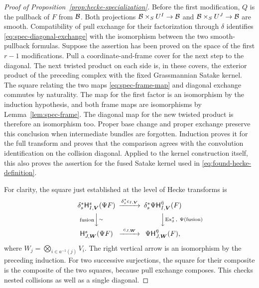\begin{proof}[Proof of Proposition~\ref{prop:hecke-specialization}]
Before the first modification, $Q$ is the pullback of $F$ from $\mathcal B$.
Both projections $\mathcal B\times_S U^I\to\mathcal B$ and
$\mathcal B\times_S U^J\to\mathcal B$ are smooth.  Compatibility of pull exchange
for their factorization through $\delta$ identifies
\eqref{eq:spec-diagonal-exchange} with the isomorphism between the two
smooth-pullback formulas.  Suppose the assertion has been proved on the
space of the first $r-1$ modifications.  Pull a coordinate-and-frame
cover for the next step to the diagonal.  The next twisted product on
each side is, in these covers, the exterior product of the preceding
complex with the fixed Grassmannian Satake kernel.  The square relating
the two maps \eqref{eq:spec-frame-map} and diagonal exchange commutes
by naturality.  The map for the first factor is an isomorphism by the
induction hypothesis, and both frame maps are isomorphisms by
Lemma~\ref{lem:spec-frame}.  The diagonal map for the new twisted
product is therefore an isomorphism too.  Proper base change and proper
exchange preserve this conclusion when intermediate bundles are
forgotten.  Induction proves it for the full transform and proves that
the comparison agrees with the convolution identification on the
collision diagonal.  Applied to the kernel construction itself, this
also proves the assertion for the fused Satake kernel used in
\eqref{eq:found-hecke-definition}.

For clarity, the square just established at the level of Hecke transforms
is
\[
\begin{CD}
 \delta_s^*\Hecke^s_{I,\boldsymbol V}(\Psi F)
       @>{\delta_s^*c_{I,\boldsymbol V}}>>
             \delta_s^*\Psi \Hecke^{\bar\eta}_{I,\boldsymbol V}(F)\\
 @V{\mathrm{fusion}}V{\sim}V
       @VV{\operatorname{Ex}^*_{\delta}\,,\ \Psi(\mathrm{fusion})}V\\
 \Hecke^s_{J,\boldsymbol W}(\Psi F)
       @>{c_{J,\boldsymbol W}}>>
             \Psi \Hecke^{\bar\eta}_{J,\boldsymbol W}(F),
\end{CD}
\]
where $W_j=\bigotimes_{i\in a^{-1}(j)}V_i$.  The right vertical
arrow is an isomorphism by the preceding induction.  For two successive
surjections, the square for their composite is the composite of the two
squares, because pull exchange composes.  This checks nested collisions
as well as a single diagonal.


\end{proof}
